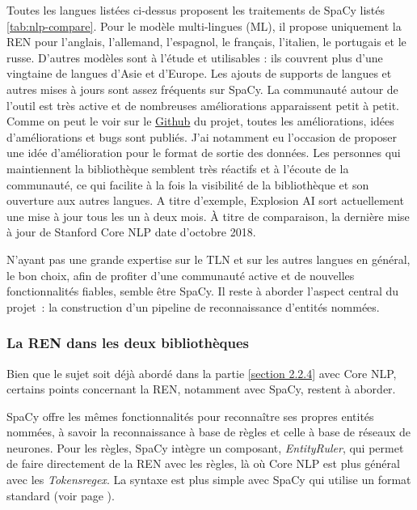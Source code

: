 Toutes les langues listées ci-dessus proposent les traitements de SpaCy listés \autoref{tab:nlp-compare}. Pour le modèle multi-lingues (ML), il propose uniquement la REN pour l'anglais, l'allemand, l'espagnol, le français, l'italien, le portugais et le russe. D'autres modèles sont à l'étude et utilisables : ils couvrent plus d'une vingtaine de langues d'Asie et d'Europe. Les ajouts de supports de langues et autres mises à jours sont assez fréquents sur SpaCy. La communauté autour de l'outil est très active et de nombreuses améliorations apparaissent petit à petit. Comme on peut le voir sur le \href{https://github.com/explosion/spaCy}{Github} \cite{spacy-repo} du projet, toutes les améliorations, idées d'améliorations et bugs sont publiés. J'ai notamment eu l'occasion de proposer une idée d'amélioration pour le format de sortie des données. Les personnes qui maintiennent la bibliothèque semblent très réactifs et à l'écoute de la communauté, ce qui facilite à la fois la visibilité de la bibliothèque et son ouverture aux autres langues. A titre d'exemple, Explosion AI sort actuellement une mise à jour tous les un à deux mois. À titre de comparaison, la dernière mise à jour de Stanford Core NLP date d'octobre 2018.
\newline

N'ayant pas une grande expertise sur le TLN et sur les autres langues en général, le bon choix, afin de profiter d'une communauté active et de nouvelles fonctionnalités fiables, semble être SpaCy. Il reste  à aborder l'aspect central du projet~: la construction d'un pipeline de reconnaissance d'entités nommées.
\label{section 3.1.3}

\subsubsection{La REN dans les deux bibliothèques}
Bien que le sujet soit déjà abordé dans la partie \ref{section 2.2.4} avec Core NLP, certains points concernant la REN, notamment avec SpaCy, restent à aborder. 
\newline

SpaCy offre les mêmes fonctionnalités pour reconnaître ses propres entités nommées, à savoir la reconnaissance à base de règles et celle à base de réseaux de neurones. Pour les règles, SpaCy intègre un composant, \textit{EntityRuler}, qui permet de faire directement de la REN avec les règles, là où Core NLP est plus général avec les \textit{Tokensregex}. La syntaxe est plus simple avec SpaCy qui utilise un format standard (voir page \pageref{rule-exemple}).
\newline

